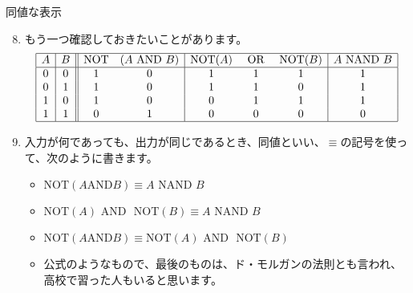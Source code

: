 \documentclass[10pt, dvipdfmx]{beamer}
\begin{document}
\begin{frame}{同値な表示}
\begin{enumerate}
\setcounter{enumi}{7}
\item もう一つ確認しておきたいことがあります。
\[ \begin{array}{|c|c||cc|ccc|c|} \hline A  & B  & \mbox{NOT}  & (A \mbox{ AND } B)  & \mbox{NOT}(A)  & \mbox{ OR }  & \mbox{NOT}(B)  & A \mbox{ NAND } B \\ \hline 0  & 0  & 1  & 0  & 1  & 1  & 1  & 1 \\ 0  & 1  & 1  & 0  & 1  & 1  & 0  & 1 \\ 1  & 0  & 1  & 0  & 0  & 1  & 1  & 1 \\ 1  & 1  & 0  & 1  & 0  & 0  & 0  & 0 \\ \hline \end{array} \]

\item 入力が何であっても、出力が同じであるとき、同値といい、$\equiv$の記号を使って、次のように書きます。  
\begin{itemize}
    \item \(\mbox{NOT}(A \mbox{AND} B) \equiv A \mbox{ NAND } B\)
    \item \(\mbox{NOT}(A) \mbox{ AND } \mbox{ NOT}(B) \equiv A \mbox{ NAND } B\)
    \item \(\mbox{NOT}(A \mbox{AND} B) \equiv \mbox{NOT}(A) \mbox{ AND } \mbox{ NOT}(B)\)
    \item 公式のようなもので、最後のものは、ド・モルガンの法則とも言われ、高校で習った人もいると思います。
\end{itemize}

\end{enumerate}
\end{frame}
\end{document}
